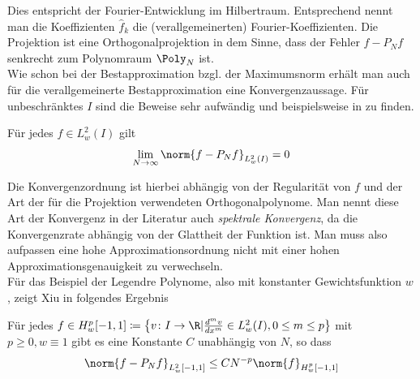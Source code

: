 Dies entspricht der Fourier-Entwicklung im Hilbertraum. Entsprechend nennt man die Koeffizienten $\hat{f}_k$ die (verallgemeinerten) Fourier-Koeffizienten. Die Projektion ist eine Orthogonalprojektion in dem Sinne, dass der Fehler $f-P_Nf$ senkrecht zum Polynomraum $\Poly_N$ ist.\\
Wie schon bei der Bestapproximation bzgl. der Maximumsnorm erhält man auch für die verallgemeinerte Bestapproximation eine Konvergenzaussage. Für unbeschränktes $I$ sind die Beweise sehr aufwändig und beispielsweise in \autocite{CouHil53} zu finden. 
\begin{maththeorem}
Für jedes $f\in L_w^2(I)$ gilt
\[\lim\limits_{N\to\infty}\norm{f-P_Nf}_{L_w^2(I)}=0\]
\end{maththeorem}
Die Konvergenzordnung ist hierbei abhängig von der Regularität von $f$ und der Art der für die Projektion verwendeten Orthogonalpolynome. Man nennt diese Art der Konvergenz in der Literatur auch \emph{spektrale Konvergenz}, da die Konvergenzrate abhängig von der Glattheit der Funktion ist. Man muss also aufpassen eine hohe Approximationsordnung nicht mit einer hohen Approximationsgenauigkeit zu verwechseln.\\
Für das Beispiel der Legendre Polynome, also mit konstanter Gewichtsfunktion $w$, zeigt Xiu in \autocite[Theorem 3.6]{dongbinxiu2010} folgendes Ergebnis
\begin{maththeorem}
\label{spectralconvth}
Für jedes $f\in H_w^p[-1,1]\coloneqq \left\lbrace v\colon I\to\R | \frac{d^mv}{dx^m}\in L_w^2(I),0\le m\le p\right\rbrace$ mit $p\ge 0, w\equiv 1$ gibt es eine Konstante $C$ unabhängig von $N$, so dass
\[\norm{f-P_Nf}_{L_w^2[-1,1]}\le CN^{-p}\norm{f}_{H_w^p[-1,1]}\]
\end{maththeorem}
